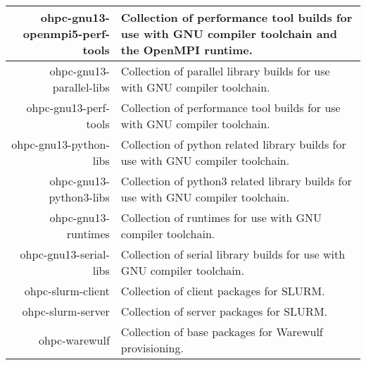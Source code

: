 \begin{tabularx}{\textwidth}{r|X}
\hline
ohpc-gnu13-openmpi5-perf-tools & Collection of performance tool builds for use with GNU compiler toolchain and the OpenMPI runtime. \\
\hline
ohpc-gnu13-parallel-libs & Collection of parallel library builds for use with GNU compiler toolchain. \\
\hline
ohpc-gnu13-perf-tools & Collection of performance tool builds for use with GNU compiler toolchain. \\
\hline
ohpc-gnu13-python-libs & Collection of python related library builds for use with GNU compiler toolchain. \\
\hline
ohpc-gnu13-python3-libs & Collection of python3 related library builds for use with GNU compiler toolchain. \\
\hline
ohpc-gnu13-runtimes & Collection of runtimes for use with GNU compiler toolchain. \\
\hline
ohpc-gnu13-serial-libs & Collection of serial library builds for use with GNU compiler toolchain. \\
\hline
ohpc-slurm-client & Collection of client packages for SLURM. \\
\hline
ohpc-slurm-server & Collection of server packages for SLURM. \\
\hline
ohpc-warewulf & Collection of base packages for Warewulf provisioning. \\
\hline
\bottomrule
\end{tabularx}
